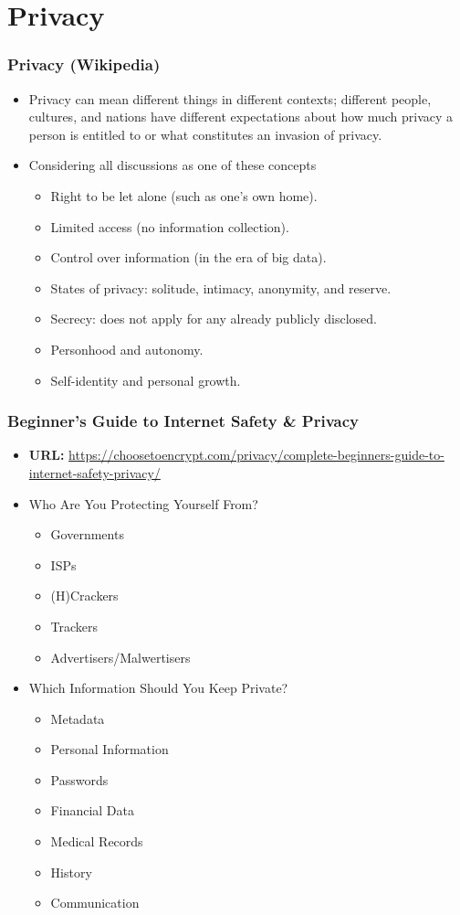 \documentclass[aspectratio=169, xcolor=table, notheorems, hyperref={pdfpagelabels=false}]{beamer}
\begin{document}
\section{Privacy}
\begin{frame}[fragile]
\frametitle{Privacy (Wikipedia)}
\begin{itemize}
\item Privacy can mean different things in different contexts; different people, 
      cultures, and nations have different expectations about how much privacy 
      a person is entitled to or what constitutes an invasion of privacy.
\item Considering all discussions as one of these concepts
\begin{itemize}
\item Right to be let alone (such as one's own home).
\item Limited access (no information collection).
\item Control over information (in the era of big data).
\item States of privacy: solitude, intimacy, anonymity, and reserve.
\item Secrecy: does not apply for any already publicly disclosed.
\item Personhood and autonomy.
\item Self-identity and personal growth.
\end{itemize}
\end{itemize}
\end{frame}

\begin{frame}[fragile]
\frametitle{Beginner's Guide to Internet Safety \& Privacy}
\begin{itemize}
\item \textbf{URL:} \url{https://choosetoencrypt.com/privacy/complete-beginners-guide-to-internet-safety-privacy/}
\item Who Are You Protecting Yourself From?
\begin{itemize}
\item Governments
\item ISPs
\item (H)Crackers
\item Trackers
\item Advertisers/Malwertisers
\end{itemize}
\item Which Information Should You Keep Private?
\begin{itemize}
\item Metadata
\item Personal Information
\item Passwords
\item Financial Data
\item Medical Records
\item History
\item Communication
\end{itemize}
\end{itemize}
\end{frame}
\end{document}
